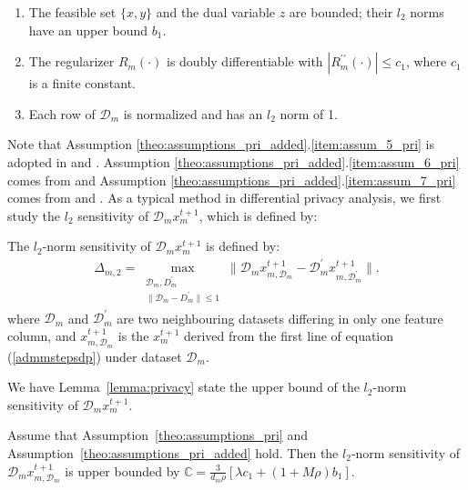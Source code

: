 \begin{assume}\label{theo:assumptions_pri_added}
  \begin{enumerate}
    \item The feasible set $\{x,y\}$ and the dual variable $z$ are bounded; their $l_2$ norms have an upper bound $b_1$.\label{item:assum_5_pri}
    \item The regularizer $R_m(\cdot)$ is doubly differentiable
    with $|R_m^{\prime\prime}(\cdot)|\leq c_1$, where $c_1$ is a finite constant.\label{item:assum_6_pri}
    \item Each row of $\mathcal{D}_m$ is normalized and has an $l_2$ norm of 1.\label{item:assum_7_pri}
  \end{enumerate}
\end{assume}
Note that Assumption \ref{theo:assumptions_pri_added}.\ref{item:assum_5_pri} is adopted in \cite{sarwate2013signal} and \cite{wang2019global}. Assumption \ref{theo:assumptions_pri_added}.\ref{item:assum_6_pri} comes from \cite{zhang2017dynamic} and Assumption \ref{theo:assumptions_pri_added}.\ref{item:assum_7_pri} comes from \cite{zhang2017dynamic}
and \cite{sarwate2013signal}. As a typical method in differential privacy analysis, we first study the $l_2$ sensitivity of
$\mathcal{D}_mx_m^{t+1}$, which is defined by:
\begin{defi}
The $l_2$-norm sensitivity of $\mathcal{D}_mx_m^{t+1}$ is defined by:
  \begin{eqnarray*}
\Delta_{m,2}=\max_{\substack{\mathcal{D}_m,D_m^{\prime}\\
\|\mathcal{D}_m-D_m^{\prime}\|\leq1
}}\|\mathcal{D}_mx_{m,\mathcal{D}_m}^{t+1}
-\mathcal{D}_m^{\prime}x_{m,\mathcal{D}_m^{\prime}}^{t+1}\|.
  \end{eqnarray*}
  where $\mathcal{D}_m$ and $\mathcal{D}_m^{\prime}$ are two neighbouring datasets differing in 
  only one feature column, and 
  $x_{m,\mathcal{D}_m}^{t+1}$ is the $x_m^{t+1}$ derived from the first line of equation 
  (\ref{admmstepsdp}) under dataset $\mathcal{D}_m$.
\end{defi}
We have Lemma~\ref{lemma:privacy} state the upper bound of the $l_2$-norm sensitivity of $\mathcal{D}_mx_m^{t+1}$.
\begin{lemma}
\label{lemma:privacy}
  Assume that Assumption~\ref{theo:assumptions_pri} and Assumption~\ref{theo:assumptions_pri_added} hold.
Then the $l_2$-norm sensitivity of $\mathcal{D}_mx_{m,\mathcal{D}_m}^{t+1}$ is upper bounded by $\mathbb{C}=\frac{3}{d_m\rho}\left[\lambda c_1+(1+M\rho)b_1\right]$.
\end{lemma}

